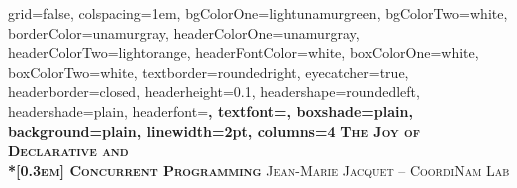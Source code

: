 \documentclass[portrait,final,a0paper]{nadiposter}
\begin{document}







\begin{poster}%
  {
  grid=false,
  colspacing=1em,
  bgColorOne=lightunamurgreen,
  bgColorTwo=white,
  borderColor=unamurgray,
  headerColorOne=unamurgray,
  headerColorTwo=lightorange,
  headerFontColor=white,
  boxColorOne=white,
  boxColorTwo=white,
  textborder=roundedright,
  eyecatcher=true,
  headerborder=closed,
  headerheight=0.1\textheight,
  headershape=roundedleft,
  headershade=plain,
  headerfont=\Large\bf\textsc, %
  textfont={\setlength{\parindent}{1.5em}},
  boxshade=plain,
  background=plain,
  linewidth=2pt,
  columns=4
  }
  {\hbox{} } %
  {\bf\textsc{The Joy of Declarative and \\*[0.3em] Concurrent Programming}\vspace{0.5em}}
  {\textsc{Jean-Marie Jacquet -- CoordiNam Lab} }
  {%
   \hbox{} %
  }



\sectionfont{\centering}

\end{poster}
\end{document}
